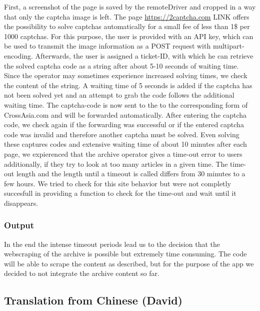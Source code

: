\documentclass[12pt,a4paper]{article}
\begin{document}
First, a screenshot of the page is saved by the remoteDriver and cropped in a way that only the captcha image is left. The page \url{https://2captcha.com} LINK offers the possibility to solve captchas automatically for a small fee of less than 1\$ per 1000 captchas. For this purpose, the user is provided with an API key, which can be used to transmit the image information as a POST request with multipart-encoding. Afterwards, the user is assigned a ticket-ID, with which he can retrieve the solved captcha code as a string after about 5-10 seconds of waiting time. Since the operator may sometimes experience increased solving times, we check the content of the string. A waiting time of 5 seconds is added if the captcha has not been solved yet and an attempt to grab the code follows the additional waiting time. The captcha-code is now sent to the to the corresponding form of CrossAsia.com and will be forwarded automatically. After entering the captcha code, we check again if the forwarding was successful or if the entered captcha code was invalid and therefore another captcha must be solved. Even solving these captures codes and extensive waiting time of about 10 minutes after each page, we expierenced that the archive operator gives a time-out error to users additionally, if they try to look at too many articles in a given time. The time-out length and the length until a timeout is called differs from 30 minutes to a few hours. We tried to check for this site behavior but were not completly succesfull in providing a function to check for the time-out and wait until it disappears.

\hypertarget{output}{%
\subsubsection{Output}\label{output}}

In the end the intense timeout periods lead us to the decision that the webscraping of the archive is possible but extremely time consuming. The code will be able to scrape the content as described, but for the purpose of the app we decided to not integrate the archive content so far.

\hypertarget{translation-from-chinese-david}{%
\subsection{Translation from Chinese (David)}\label{translation-from-chinese-david}}
\end{document}
